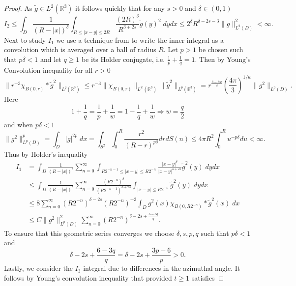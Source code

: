 \documentclass[11pt, reqno]{article}
\def\R{{\mathbb R}} %
\begin{document}
\begin{proof}
    As $\tilde{g} \in L^2(\R^3)$  it follows quickly that for any $s > 0$ and $\delta \in (0,1)$
    \[
        I_2 \leq \int_D \frac{1}{(R - |x|)^\delta}\int_{R \leq |x-y| \leq 2R}  \frac{(2R)^\delta}{R^{3+2s}}\tilde{g}(y)^2\;dydx \leq 2^\delta R^{\delta - 2s-3}\|g\|_{L^2(D)}^2 < \infty.
    \]
    Next to study $I_1$ we use a technique from \cite{hedberg1972certain} to write the inner integral as a convolution which is averaged over a ball of radius $R$. 
    Let $p > 1$ be chosen such that $p\delta < 1$ and let $q\geq 1$ be its Holder conjugate, i.e. $\frac{1}{p} + \frac{1}{q} = 1$.  Then  by Young's Convolution inequality for all $r > 0$
    \[
        \|r^{-3} \chi_{B(0, r)} * \tilde{g}^2\|_{L^q(\R^3)} \leq r^{-3}\|\chi_{B(0,r)}\|_{L^w(\R^3)}\|\tilde{g}^2\|_{L^p(\R^3)} = r^{\frac{3-3w}{w}}(\frac{4\pi}{3})^{1/w}\|g^2\|_{L^p(D)}.
    \]
    Here 
    \[
        1 + \frac{1}{q} = \frac{1}{p} + \frac{1}{w} = 1 - \frac{1}{q} + \frac{1}{w} \Rightarrow w = \frac{q}{2}
    \]
    and when $p\delta < 1$
    \[
        \|g^2\|_{L^p(D)}^p = \int_D |g|^{2p}\;dx = \int_{S^2}\int_0^R \frac{r^2}{(R-r)^{p\delta}}drdS(n) \leq 4\pi R^2 \int_0^R u^{-p\delta} du < \infty.
    \]
    Thus by Holder's inequality
    \begin{align*}
        I_1 &= \int_D \frac{1}{(R-|x|)^\delta}\sum_{n=0}^\infty \int_{R2^{-n-1} \leq |x-y| \leq R2^{-n}}\frac{|x-y|^\delta}{|x-y|^{3+2s}}\tilde{g}^2(y)\;dydx\\
        &\leq \int_D \frac{1}{(R-|x|)^\delta}\sum_{n=0}^\infty \frac{(R2^{-n})^\delta}{(R2^{-n - 1})^{3+2s}}\int_{|x-y| \leq R2^{-n}}\tilde{g}^2(y)\;dydx\\
        &\leq 8\sum_{n=0}^\infty (R2^{-n})^{\delta - 2s} (R2^{-n})^{-3}\int_{D} g^2(x) \chi_{B(0, R2^{-n})}*\tilde{g}^2(x)\;dx \\
        &\leq C\|g^2\|_{L^p(D)}^2\sum_{n=0}^\infty (R2^{-n})^{\delta - 2s + \frac{6-3q}{q}}.
    \end{align*}
    To ensure that this geometric series converges we choose $\delta, s, p,q$ such that $p\delta < 1$ and
    \[
        \delta - 2s + \frac{6-3q}{q} = \delta - 2s + \frac{3p-6}{p}> 0.
    \]
    Lastly, we consider the $I_3$ integral due to differences in the azimuthal angle. It follows by Young's convolution inequality that provided $t \geq 1$ satisfies

\end{proof}
\end{document}
